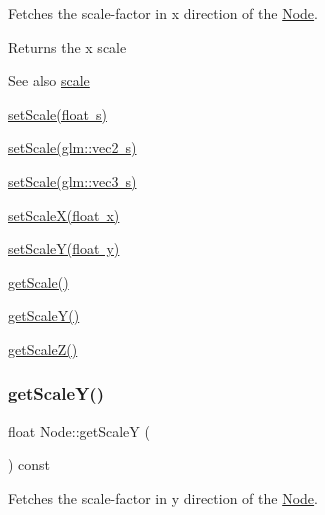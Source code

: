 Fetches the scale-\/factor in x direction of the \mbox{\hyperlink{classsage_1_1Node}{Node}}. 

\begin{DoxyReturn}{Returns}
the x scale 
\end{DoxyReturn}
\begin{DoxySeeAlso}{See also}
\mbox{\hyperlink{classsage_1_1Node_a686c3edeea1faab8b566bfdf2fe3f906}{scale}} 

\mbox{\hyperlink{classsage_1_1Node_a939698b2eb68ee5b60b91e2426e95369}{set\+Scale(float s)}} 

\mbox{\hyperlink{classsage_1_1Node_aecff30b003ce1c2266cc60a34b72559d}{set\+Scale(glm\+::vec2 s)}} 

\mbox{\hyperlink{classsage_1_1Node_a7481b934a6ef259a14aee4d0b87cb2aa}{set\+Scale(glm\+::vec3 s)}} 

\mbox{\hyperlink{classsage_1_1Node_ab8126397f90ccdee0755b984b26809d8}{set\+Scale\+X(float x)}} 

\mbox{\hyperlink{classsage_1_1Node_afa22161545d63e9e011f8eeb5acdead7}{set\+Scale\+Y(float y)}} 

\mbox{\hyperlink{classsage_1_1Node_ac41e15cac1e23a4c48798291c70dcdd8}{get\+Scale()}} 

\mbox{\hyperlink{classsage_1_1Node_ab87661ab8940512baf2e7639ea55ff87}{get\+Scale\+Y()}} 

\mbox{\hyperlink{classsage_1_1Node_a0b55ddbe04d126953e1db8606d9a9ecd}{get\+Scale\+Z()}} 
\end{DoxySeeAlso}
\mbox{\label{classsage_1_1Node_ab87661ab8940512baf2e7639ea55ff87}} 
\subsubsection{\texorpdfstring{getScaleY()}{getScaleY()}}
{\footnotesize\ttfamily float Node\+::get\+ScaleY (\begin{DoxyParamCaption}{ }\end{DoxyParamCaption}) const}



Fetches the scale-\/factor in y direction of the \mbox{\hyperlink{classsage_1_1Node}{Node}}. 

